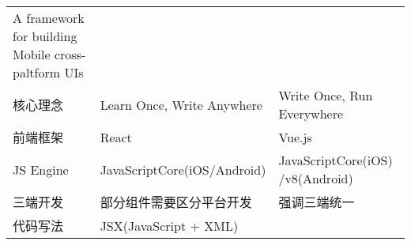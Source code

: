 \begin{longtable}[]{@{}lll@{}}
\begin{minipage}[t]{0.30\columnwidth}
A framework for building Mobile cross-paltform UIs\strut
\end{minipage}\tabularnewline
\begin{minipage}[t]{0.30\columnwidth}\raggedright\strut
核心理念\strut
\end{minipage} & \begin{minipage}[t]{0.30\columnwidth}\raggedright\strut
Learn Once, Write Anywhere\strut
\end{minipage} & \begin{minipage}[t]{0.30\columnwidth}\raggedright\strut
Write Once, Run Everywhere\strut
\end{minipage}\tabularnewline
\begin{minipage}[t]{0.30\columnwidth}\raggedright\strut
前端框架\strut
\end{minipage} & \begin{minipage}[t]{0.30\columnwidth}\raggedright\strut
React\strut
\end{minipage} & \begin{minipage}[t]{0.30\columnwidth}\raggedright\strut
Vue.js\strut
\end{minipage}\tabularnewline
\begin{minipage}[t]{0.30\columnwidth}\raggedright\strut
JS Engine\strut
\end{minipage} & \begin{minipage}[t]{0.30\columnwidth}\raggedright\strut
JavaScriptCore(iOS/Android)\strut
\end{minipage} & \begin{minipage}[t]{0.30\columnwidth}\raggedright\strut
JavaScriptCore(iOS) /v8(Android)\strut
\end{minipage}\tabularnewline
\begin{minipage}[t]{0.30\columnwidth}\raggedright\strut
三端开发\strut
\end{minipage} & \begin{minipage}[t]{0.30\columnwidth}\raggedright\strut
部分组件需要区分平台开发\strut
\end{minipage} & \begin{minipage}[t]{0.30\columnwidth}\raggedright\strut
强调三端统一\strut
\end{minipage}\tabularnewline
\begin{minipage}[t]{0.30\columnwidth}\raggedright\strut
代码写法\strut
\end{minipage} & \begin{minipage}[t]{0.30\columnwidth}\raggedright\strut
JSX(JavaScript + XML)\strut
\end{minipage} & \begin{minipage}[t]{0.30\columnwidth}\raggedright\strut

\end{minipage}
\end{longtable}
